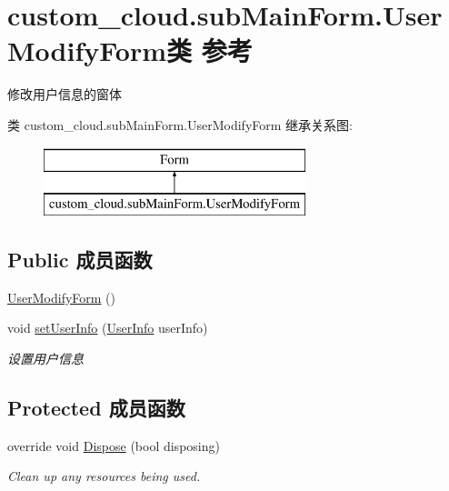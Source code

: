 \hypertarget{classcustom__cloud_1_1sub_main_form_1_1_user_modify_form}{}\section{custom\+\_\+cloud.\+sub\+Main\+Form.\+User\+Modify\+Form类 参考}
\label{classcustom__cloud_1_1sub_main_form_1_1_user_modify_form}


修改用户信息的窗体  


类 custom\+\_\+cloud.\+sub\+Main\+Form.\+User\+Modify\+Form 继承关系图\+:\begin{figure}[H]
\begin{center}
\leavevmode
\includegraphics[height=2.000000cm]{classcustom__cloud_1_1sub_main_form_1_1_user_modify_form}
\end{center}
\end{figure}
\subsection*{Public 成员函数}
\begin{DoxyCompactItemize}
\item 
\hyperlink{classcustom__cloud_1_1sub_main_form_1_1_user_modify_form_a5da6788362cd66a2c568f150a507b9f0}{User\+Modify\+Form} ()
\item 
void \hyperlink{classcustom__cloud_1_1sub_main_form_1_1_user_modify_form_a5bde7223c3602dbe0160604617e9b0e3}{set\+User\+Info} (\hyperlink{classcustom__cloud_1_1_user_info}{User\+Info} user\+Info)
\begin{DoxyCompactList}\small\item\em 设置用户信息 \end{DoxyCompactList}\end{DoxyCompactItemize}
\subsection*{Protected 成员函数}
\begin{DoxyCompactItemize}
\item 
override void \hyperlink{classcustom__cloud_1_1sub_main_form_1_1_user_modify_form_a9eed85f842f70d0fedda4854be40b8c5}{Dispose} (bool disposing)
\begin{DoxyCompactList}\small\item\em Clean up any resources being used. \end{DoxyCompactList}\end{DoxyCompactItemize}


